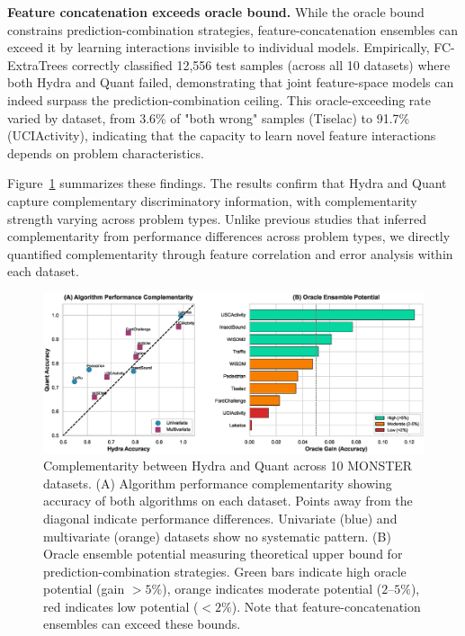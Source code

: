 \documentclass[pdflatex,sn-basic]{sn-jnl}           %
\theoremstyle{thmstyleone}%
\theoremstyle{thmstyletwo}%
\theoremstyle{thmstylethree}%
\begin{document}
\textbf{Feature concatenation exceeds oracle bound.} While the oracle bound constrains prediction-combination strategies, feature-concatenation ensembles can exceed it by learning interactions invisible to individual models. Empirically, FC-ExtraTrees correctly classified 12,556 test samples (across all 10 datasets) where both Hydra and Quant failed, demonstrating that joint feature-space models can indeed surpass the prediction-combination ceiling. This oracle-exceeding rate varied by dataset, from 3.6\% of "both wrong" samples (Tiselac) to 91.7\% (UCIActivity), indicating that the capacity to learn novel feature interactions depends on problem characteristics.

Figure~\ref{fig:complementarity} summarizes these findings. The results confirm that Hydra and Quant capture complementary discriminatory information, with complementarity strength varying across problem types. Unlike previous studies that inferred complementarity from performance differences across problem types, we directly quantified complementarity through feature correlation and error analysis within each dataset.

\begin{figure}[t]
\centering
\includegraphics[width=\textwidth]{figure1_complementarity}
\caption{Complementarity between Hydra and Quant across 10 MONSTER datasets. (A) Algorithm performance complementarity showing accuracy of both algorithms on each dataset. Points away from the diagonal indicate performance differences. Univariate (blue) and multivariate (orange) datasets show no systematic pattern. (B) Oracle ensemble potential measuring theoretical upper bound for prediction-combination strategies. Green bars indicate high oracle potential (gain $>5\%$), orange indicates moderate potential ($2$--$5\%$), red indicates low potential ($<2\%$). Note that feature-concatenation ensembles can exceed these bounds.}\label{fig:complementarity}
\end{figure}
\end{document}
